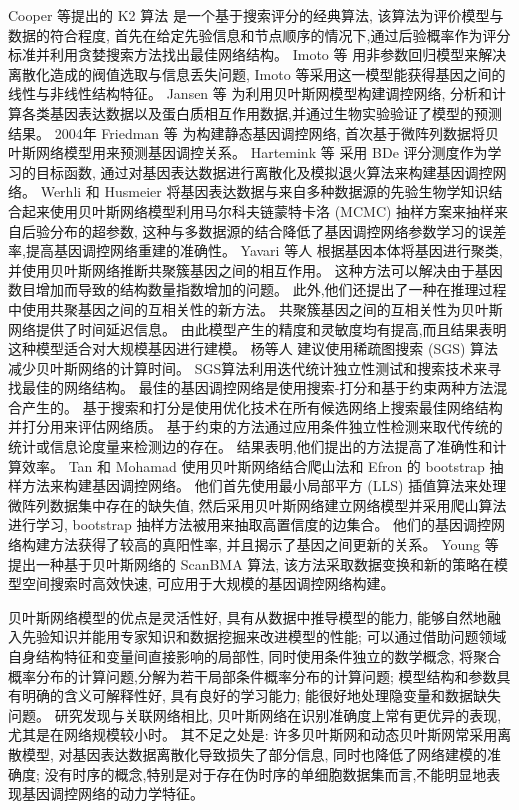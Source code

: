 Cooper 等提出的 K2 算法 \cite{cooper1992bayesian} 是一个基于搜索评分的经典算法,
该算法为评价模型与数据的符合程度,
首先在给定先验信息和节点顺序的情况下,通过后验概率作为评分标准并利用贪婪搜索方法找出最佳网络结构。
Imoto 等 \cite{kim2003inferring} 用非参数回归模型来解决离散化造成的阀值选取与信息丢失问题,
Imoto 等采用这一模型能获得基因之间的线性与非线性结构特征。
Jansen 等 \cite{jansen2003bayesian} 为利用贝叶斯网模型构建调控网络,
分析和计算各类基因表达数据以及蛋白质相互作用数据,并通过生物实验验证了模型的预测结果。
2004年 Friedman 等 \cite{friedman2004inferring} 为构建静态基因调控网络,
首次基于微阵列数据将贝叶斯网络模型用来预测基因调控关系。
Hartemink 等 \cite{hartemink2005reverse} 采用 BDe 评分测度作为学习的目标函数,
通过对基因表达数据进行离散化及模拟退火算法来构建基因调控网络。
Werhli 和 Husmeier \cite{werhli2007reconstructing} 将基因表达数据与来自多种数据源的先验生物学知识结合起来使用贝叶斯网络模型利用马尔科夫链蒙特卡洛 (MCMC) 抽样方案来抽样来自后验分布的超参数,
这种与多数据源的结合降低了基因调控网络参数学习的误差率,提高基因调控网络重建的准确性。
Yavari 等人 \cite{yavari2008gene} 根据基因本体将基因进行聚类,
并使用贝叶斯网络推断共聚簇基因之间的相互作用。
这种方法可以解决由于基因数目增加而导致的结构数量指数增加的问题。 
此外,他们还提出了一种在推理过程中使用共聚基因之间的互相关性的新方法。
共聚簇基因之间的互相关性为贝叶斯网络提供了时间延迟信息。 
由此模型产生的精度和灵敏度均有提高,而且结果表明这种模型适合对大规模基因进行建模。
杨等人 \cite{yang2011bayesian} 建议使用稀疏图搜索 (SGS) 算法减少贝叶斯网络的计算时间。
SGS算法利用迭代统计独立性测试和搜索技术来寻找最佳的网络结构。
最佳的基因调控网络是使用搜索-打分和基于约束两种方法混合产生的。
基于搜索和打分是使用优化技术在所有候选网络上搜索最佳网络结构并打分用来评估网络质。
基于约束的方法通过应用条件独立性检测来取代传统的统计或信息论度量来检测边的存在。
结果表明,他们提出的方法提高了准确性和计算效率。
Tan 和 Mohamad \cite{kunga2012using} 使用贝叶斯网络结合爬山法和 Efron 的 bootstrap 抽样方法来构建基因调控网络。
他们首先使用最小局部平方 (LLS) 插值算法来处理微阵列数据集中存在的缺失值, 
然后采用贝叶斯网络建立网络模型并采用爬山算法进行学习, 
bootstrap 抽样方法被用来抽取高置信度的边集合。
他们的基因调控网络构建方法获得了较高的真阳性率, 并且揭示了基因之间更新的关系。 
Young 等 \cite{young2014fast} 提出一种基于贝叶斯网络的 ScanBMA 算法,
该方法采取数据变换和新的策略在模型空间搜索时高效快速,
可应用于大规模的基因调控网络构建。

贝叶斯网络模型的优点是灵活性好, 具有从数据中推导模型的能力, 能够自然地融入先验知识并能用专家知识和数据挖掘来改进模型的性能;
可以通过借助问题领域自身结构特征和变量间直接影响的局部性, 同时使用条件独立的数学概念, 将聚合概率分布的计算问题,分解为若干局部条件概率分布的计算问题;
模型结构和参数具有明确的含义可解释性好, 具有良好的学习能力; 能很好地处理隐变量和数据缺失问题。
研究发现与关联网络相比, 贝叶斯网络在识别准确度上常有更优异的表现, 尤其是在网络规模较小时。
其不足之处是: 许多贝叶斯网和动态贝叶斯网常采用离散模型, 对基因表达数据离散化导致损失了部分信息,
同时也降低了网络建模的准确度;
没有时序的概念,特别是对于存在伪时序的单细胞数据集而言,不能明显地表现基因调控网络的动力学特征。

